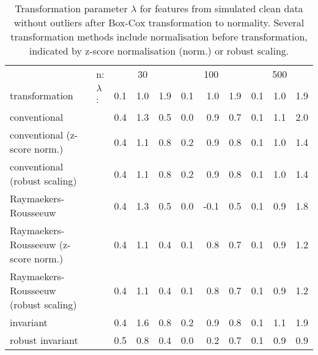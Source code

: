 \documentclass[
  a4paper,
]{article}
\begin{document}
\begin{table}
\begin{center}
\caption{Transformation parameter $\lambda$ for features from simulated clean data without outliers after Box-Cox transformation to normality.
Several transformation methods include normalisation before transformation, indicated by z-score normalisation (norm.) or robust scaling.}
\label{tab:clean-transformation-appendix-lambda-bc}
\small{
\begin{tabular}{l | l r r r r r r r r r}

\toprule
& n: & \multicolumn{3}{c}{30} & \multicolumn{3}{c}{100} & \multicolumn{3}{c}{500} \\
transformation & $\lambda$: & 0.1 & 1.0 & 1.9 & 0.1 & 1.0 & 1.9 & 0.1 & 1.0 & 1.9 \\

\midrule

conventional                          & & 0.4 & 1.3 & 0.5 & 0.0 &  0.9 & 0.7 & 0.1 & 1.1 & 2.0 \\
conventional (z-score norm.)          & & 0.4 & 1.1 & 0.8 & 0.2 &  0.9 & 0.8 & 0.1 & 1.0 & 1.4 \\
conventional (robust scaling)         & & 0.4 & 1.1 & 0.8 & 0.2 &  0.9 & 0.8 & 0.1 & 1.0 & 1.4 \\
Raymaekers-Rousseeuw                  & & 0.4 & 1.3 & 0.5 & 0.0 & -0.1 & 0.5 & 0.1 & 0.9 & 1.8 \\
Raymaekers-Rousseeuw (z-score norm.)  & & 0.4 & 1.1 & 0.4 & 0.1 &  0.8 & 0.7 & 0.1 & 0.9 & 1.2 \\
Raymaekers-Rousseeuw (robust scaling) & & 0.4 & 1.1 & 0.4 & 0.1 &  0.8 & 0.7 & 0.1 & 0.9 & 1.2 \\
invariant                             & & 0.4 & 1.6 & 0.8 & 0.2 &  0.9 & 0.8 & 0.1 & 1.1 & 1.9 \\
robust invariant                      & & 0.5 & 0.8 & 0.4 & 0.0 &  0.2 & 0.7 & 0.1 & 0.9 & 0.9 \\

\bottomrule
\end{tabular}
}
\end{center}
\end{table}
\end{document}
